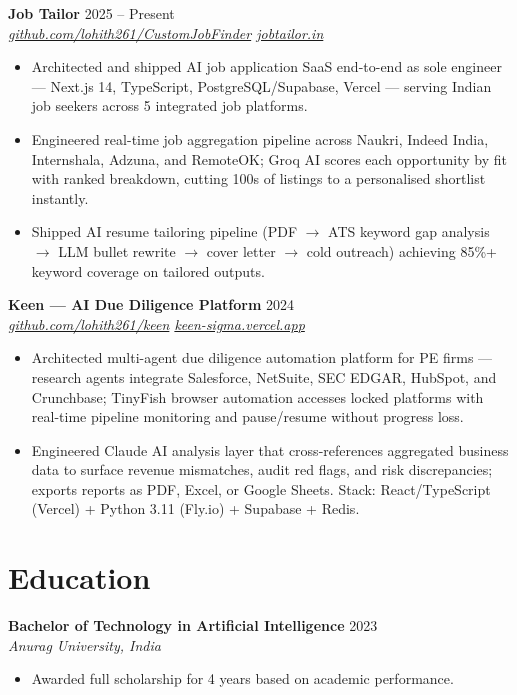 \documentclass[10pt, letterpaper]{article}
\newcommand{\resumeEntry}[3]{%
  \vspace{4pt}%
  \textbf{#1} \hfill #3 \\
  \textit{\small #2}%
  \vspace{1pt}%
}
\begin{document}
\resumeEntry{Job Tailor}{\href{https://github.com/lohith261/CustomJobFinder}{github.com/lohith261/CustomJobFinder} \quad\textbullet\quad \href{https://jobtailor.in}{jobtailor.in}}{2025 -- Present}
\begin{itemize}
  \item Architected and shipped AI job application SaaS end-to-end as sole engineer — Next.js 14, TypeScript, PostgreSQL/Supabase, Vercel — serving Indian job seekers across 5 integrated job platforms.
  \item Engineered real-time job aggregation pipeline across Naukri, Indeed India, Internshala, Adzuna, and RemoteOK; Groq AI scores each opportunity by fit with ranked breakdown, cutting 100s of listings to a personalised shortlist instantly.
  \item Shipped AI resume tailoring pipeline (PDF $\to$ ATS keyword gap analysis $\to$ LLM bullet rewrite $\to$ cover letter $\to$ cold outreach) achieving 85\%+ keyword coverage on tailored outputs.
\end{itemize}

\vspace{4pt}
\resumeEntry{Keen — AI Due Diligence Platform}{\href{https://github.com/lohith261/keen}{github.com/lohith261/keen} \quad\textbullet\quad \href{https://keen-sigma.vercel.app}{keen-sigma.vercel.app}}{2024}
\begin{itemize}
  \item Architected multi-agent due diligence automation platform for PE firms — research agents integrate Salesforce, NetSuite, SEC EDGAR, HubSpot, and Crunchbase; TinyFish browser automation accesses locked platforms with real-time pipeline monitoring and pause/resume without progress loss.
  \item Engineered Claude AI analysis layer that cross-references aggregated business data to surface revenue mismatches, audit red flags, and risk discrepancies; exports reports as PDF, Excel, or Google Sheets. Stack: React/TypeScript (Vercel) + Python 3.11 (Fly.io) + Supabase + Redis.
\end{itemize}

\section{Education}

\resumeEntry{Bachelor of Technology in Artificial Intelligence}{Anurag University, India}{2023}
\begin{itemize}
  \item Awarded full scholarship for 4 years based on academic performance.
\end{itemize}
\end{document}
